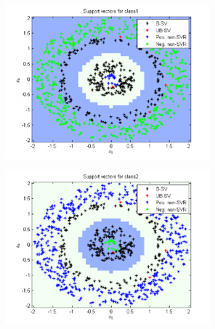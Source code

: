 \documentclass{article}
\begin{document}
\begin{figure}
\begin{subfigure}{.5\textwidth}
  \centering
  \includegraphics[width=.8\linewidth]{Classification/1b/nu_g/sv1}
 
\end{subfigure}%
\begin{subfigure}{.5\textwidth}
  \centering
  \includegraphics[width=.8\linewidth]{Classification/1b/nu_g/sv2}
  
\end{subfigure}
\end{figure}

\end{document}
